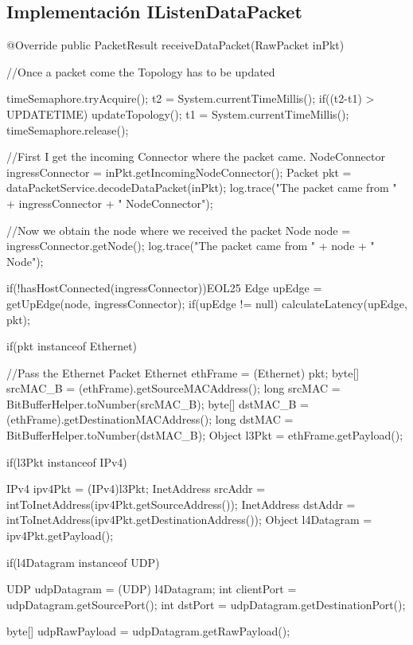 \documentclass[a4paper,11pt]{book}
\begin{document}
\subsection{Implementación IListenDataPacket}\label{listenPacket}
\begin{java}
  @Override
    public PacketResult receiveDataPacket(RawPacket inPkt) {
      //Once a packet come the Topology has to be updated

      timeSemaphore.tryAcquire();
      t2 = System.currentTimeMillis();
      if((t2-t1) > UPDATETIME){
        updateTopology();
        t1 = System.currentTimeMillis();
      }
      timeSemaphore.release();

      //First I get the incoming Connector where the packet came.
      NodeConnector ingressConnector = inPkt.getIncomingNodeConnector();
      Packet pkt = dataPacketService.decodeDataPacket(inPkt);
      log.trace("The packet came from " + ingressConnector + " NodeConnector");

      //Now we obtain the node where we received the packet
      Node node = ingressConnector.getNode();
      log.trace("The packet came from " + node + " Node");

      if(!hasHostConnected(ingressConnector)){EOL25
        Edge upEdge = getUpEdge(node, ingressConnector);
        if(upEdge != null){
          calculateLatency(upEdge, pkt);
        }
      }

      if(pkt instanceof Ethernet) {
        //Pass the Ethernet Packet
        Ethernet ethFrame = (Ethernet) pkt;
        byte[] srcMAC_B = (ethFrame).getSourceMACAddress();
        long srcMAC = BitBufferHelper.toNumber(srcMAC_B);
        byte[] dstMAC_B = (ethFrame).getDestinationMACAddress();
        long dstMAC = BitBufferHelper.toNumber(dstMAC_B);
        Object l3Pkt = ethFrame.getPayload();

        if(l3Pkt instanceof IPv4){
          IPv4 ipv4Pkt = (IPv4)l3Pkt;
          InetAddress srcAddr = intToInetAddress(ipv4Pkt.getSourceAddress());
          InetAddress dstAddr = intToInetAddress(ipv4Pkt.getDestinationAddress());
          Object l4Datagram = ipv4Pkt.getPayload();


          if(l4Datagram instanceof UDP){

            UDP udpDatagram = (UDP) l4Datagram;
            int clientPort = udpDatagram.getSourcePort();
            int dstPort = udpDatagram.getDestinationPort();


            byte[] udpRawPayload = udpDatagram.getRawPayload();

}}}}
\end{java}
\end{document}
